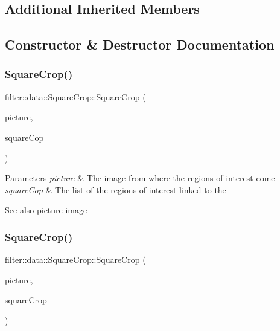 \subsection*{Additional Inherited Members}


\subsection{Constructor \& Destructor Documentation}
\mbox{\label{classfilter_1_1data_1_1_square_crop_a66d0d5077685230e0749532539e0461e}} 
\subsubsection{\texorpdfstring{Square\+Crop()}{SquareCrop()}\hspace{0.1cm}{\footnotesize\ttfamily [1/2]}}
{\footnotesize\ttfamily filter\+::data\+::\+Square\+Crop\+::\+Square\+Crop (\begin{DoxyParamCaption}\item[{\hyperlink{classfilter_1_1data_1_1_image_data}{Image\+Data}}]{picture,  }\item[{std\+::vector$<$ cv\+::\+Rect $>$}]{square\+Cop }\end{DoxyParamCaption})\hspace{0.3cm}{\ttfamily [inline]}}


\begin{DoxyParams}{Parameters}
{\em picture} & The image from where the regions of interest come \\
\hline
{\em square\+Cop} & The list of the regions of interest linked to the \\
\hline
\end{DoxyParams}
\begin{DoxySeeAlso}{See also}
picture image 
\end{DoxySeeAlso}
\mbox{\label{classfilter_1_1data_1_1_square_crop_af1b851ed583e9c5fff2fc8021d289584}} 
\subsubsection{\texorpdfstring{Square\+Crop()}{SquareCrop()}\hspace{0.1cm}{\footnotesize\ttfamily [2/2]}}
{\footnotesize\ttfamily filter\+::data\+::\+Square\+Crop\+::\+Square\+Crop (\begin{DoxyParamCaption}\item[{\hyperlink{classfilter_1_1data_1_1_image_data}{Image\+Data}}]{picture,  }\item[{std\+::vector$<$ int $>$}]{square\+Crop }\end{DoxyParamCaption})\hspace{0.3cm}{\ttfamily [inline]}}


